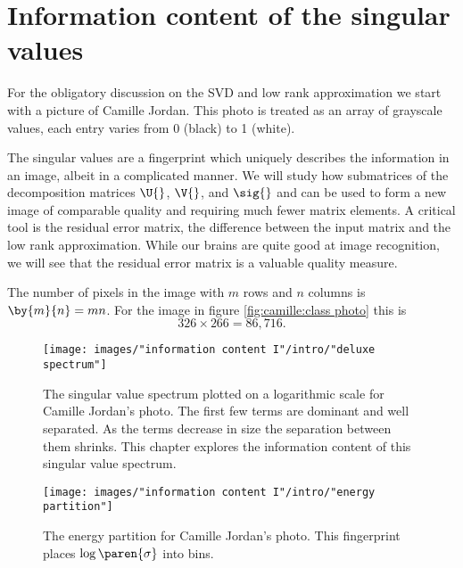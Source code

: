 \clearpage
\section[Information content of the singular values]{Information content of the singular values}
For the obligatory discussion on the SVD and low rank approximation we start with a picture of Camille Jordan. This photo is treated as an array of grayscale values, each entry varies from 0 (black) to 1 (white).


The singular values are a fingerprint which uniquely describes the information in an image, albeit in a complicated manner.
 We will study how submatrices of the decomposition matrices $\U{}$, $\V{}$, and $\sig{}$ and can be used to form a new image of comparable quality and requiring much fewer matrix elements. A critical tool is the residual error matrix, the difference between the input matrix and the low rank approximation. While our brains are quite good at image recognition, we will see that the residual error matrix is a valuable quality measure.

The number of pixels in the image with $m$ rows and $n$ columns is $\by{m}{n} = mn$. For the image in figure \eqref{fig:camille:class photo} this is
\begin{equation*}
  326 \times 266 = 86,716.
\end{equation*}



\begin{figure}[htbp] %
   \centering
   \texttt{[image: images/"information content I"/intro/"deluxe spectrum"]} 
   \caption[The singular value spectrum for Camille's photo]{The singular value spectrum plotted on a logarithmic scale for Camille Jordan's photo. The first few terms are dominant and well separated. As the terms decrease in size the separation between them shrinks. This chapter explores the information content of this singular value spectrum.}
   \label{fig:camille:spectrum}
\end{figure}

\begin{figure}[htbp] %
   \centering
   \texttt{[image: images/"information content I"/intro/"energy partition"]} 
   \caption[The energy partition for Camille's photo]{The energy partition for Camille Jordan's photo. This fingerprint places $\log\paren{\sigma}$ into bins.}
   \label{fig:camille:spectrum}
\end{figure}

